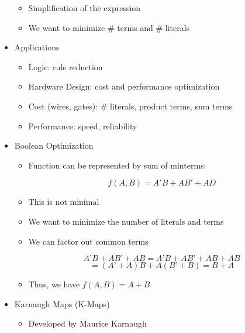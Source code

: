 \begin{itemize}
\begin{itemize}
      \item Simplification of the expression

      \item We want to minimize \# terms and \# literals

    \end{itemize}

  \item Applications

    \begin{itemize}

      \item Logic: rule reduction

      \item Hardware Design: cost and performance optimization

      \item Cost (wires, gates): \# literals, product terms, sum terms

      \item Performance: speed, reliability

    \end{itemize}

  \item Boolean Optimization

    \begin{itemize}

      \item Function can be represented by sum of minterms:

        $$f(A,B)=A'B+AB'+AD$$

      \item This is not minimal

      \item We want to minimize the number of literals and terms

      \item We can factor out common terms

        $$A’B+AB’+AB= A’B+AB’+AB+AB$$
        $$=(A’+A)B+A(B’+B)=B+A$$

      \item Thus, we have $f(A,B)=A + B$
        
    \end{itemize}

  \item Karnaugh Maps (K-Maps)

    \begin{itemize}

      \item Developed by Maurice Karnaugh


\end{itemize}
\end{itemize}
